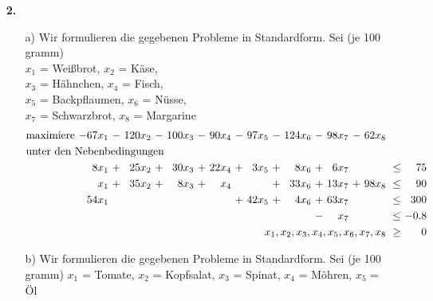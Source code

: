 \documentclass [a4paper,11pt]{article}
\begin{document}
\begin{enumerate}
\begin{enumerate}
            \end{enumerate}
        \item[\textbf{2.}]
        \begin{enumerate}
                \item[a)]
                    Wir formulieren die gegebenen Probleme in Standardform. Sei (je 100 gramm)\\
                    $x_1$ = Weißbrot, $x_2$ = Käse,\\
                    $x_3$ = Hähnchen, $x_4$ = Fisch,\\
                    $x_5$ = Backpflaumen, $x_6$ = Nüsse,\\
                    $x_7$ = Schwarzbrot, $x_8$ = Margarine\\

                \begin{align*}
                \begin{alignedat}{10}
                & \text{maximiere } & -67x_1 &\ - &\ 120x_2 &\ - &\ 100x_3 &\ - &\ 90x_4 &\ - &\ 97x_5 &\ - &\ 124x_6 &\ - &\ 98x_7 &\ - &\ 62x_8 & & \\
                & \rlap{unter den Nebenbedingungen} & & & & & & & & & & & & & & & & & \\
                &&  8x_1 &\ + &\ 25x_2 &\ + &\ 30x_3 &\ + &\ 22x_4 &\ + &\  3x_5 &\ + &\  8x_6 &\ + &\  6x_7 &     &        &\ \leq &\  75 \\
                &&   x_1 &\ + &\ 35x_2 &\ + &\  8x_3 &\ + &\   x_4 &    &        &\ + &\ 33x_6 &\ + &\ 13x_7 &\ +  &\ 98x_8 &\ \leq &\  90 \\
                && 54x_1 &    &        &    &        &    &        &\ + &\ 42x_5 &\ + &\  4x_6 &\ + &\ 63x_7 &     &        &\ \leq &\ 300 \\
                &&       &    &        &    &        &    &        &    &        &    &        &\ - &\   x_7 &     &        &\ \leq &\ -0.8 \\
                && & & & & & & & & & & & & & & \llap{$x_1, x_2, x_3, x_4, x_5, x_6, x_7, x_8$} &\ \geq &\ 0
                \end{alignedat}
                \end{align*}

				\item[b)]
					Wir formulieren die gegebenen Probleme in Standardform.
                    Sei (je 100 gramm) $x_1$ = Tomate, $x_2$ = Kopfsalat, $x_3$ = Spinat, $x_4$ = Möhren, $x_5$ = Öl
                            

\end{enumerate}
\end{enumerate}
\end{document}
